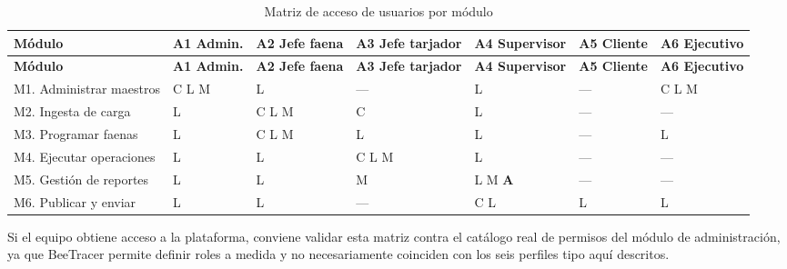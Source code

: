 {\estilotabla
\begin{longtable}{L{0.24\textwidth} C{0.11\textwidth} C{0.11\textwidth} C{0.12\textwidth} C{0.11\textwidth} C{0.11\textwidth} C{0.12\textwidth}}

\caption{Matriz de acceso de usuarios por módulo}
\label{tab:matriz}
\\

\toprule
\textbf{Módulo} & \textbf{A1 Admin.} & \textbf{A2 Jefe faena} & \textbf{A3 Jefe tarjador} &
\textbf{A4 Super\-visor} & \textbf{A5 Cliente} & \textbf{A6 Ejecutivo} \\
\midrule
\endfirsthead

\toprule
\textbf{Módulo} & \textbf{A1 Admin.} & \textbf{A2 Jefe faena} & \textbf{A3 Jefe tarjador} &
\textbf{A4 Super\-visor} & \textbf{A5 Cliente} & \textbf{A6 Ejecutivo} \\
\midrule
\endhead

M1. Administrar maestros & C L M & L & --- & L & --- & C L M  \\
\midrule
M2. Ingesta de carga & L & C L M & C  & L & --- & --- \\
\midrule
M3. Programar faenas & L & C L M & L  & L & --- & L \\
\midrule
M4. Ejecutar operaciones & L & L & C L M & L & --- & --- \\
\midrule
M5. Gestión de reportes & L & L & M  & L M \textbf{A} & --- & --- \\
\midrule
M6. Publicar y enviar & L & L & --- & C L & L  & L \\

\bottomrule

\end{longtable}
}

\begin{pendiente}
Si el equipo obtiene acceso a la plataforma, conviene validar esta matriz contra el catálogo real
de permisos del módulo de administración, ya que BeeTracer permite definir roles a medida y no
necesariamente coinciden con los seis perfiles tipo aquí descritos.
\end{pendiente}
